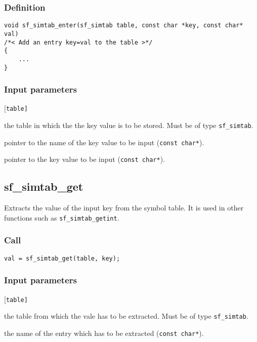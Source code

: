 \subsubsection*{Definition}
\begin{verbatim}
void sf_simtab_enter(sf_simtab table, const char *key, const char* val)
/*< Add an entry key=val to the table >*/
{
    ...
}
\end{verbatim}

\subsubsection*{Input parameters}
\begin{desclist}{\tt }{\quad}[\tt table]
   \setlength\itemsep{0pt}
   \item[table] the table in which the the key value is to be stored. Must be of type \texttt{sf\_simtab}.
   \item[key]   pointer to the name of the key value to be input (\texttt{const char*}).
   \item[val]   pointer to the key value to be input (\texttt{const char*}).
\end{desclist}




\subsection{{sf\_simtab\_get}}\label{sec:sf_simtab_get}
Extracts the value of the input key from the symbol table. It is used in other functions such as \texttt{sf\_simtab\_getint}.

\subsubsection*{Call}
\begin{verbatim}val = sf_simtab_get(table, key); \end{verbatim}

\subsubsection*{Input parameters}
\begin{desclist}{\tt }{\quad}[\tt table]
   \setlength\itemsep{0pt}
   \item[table] the table from which the vale has to be extracted. Must be of type \texttt{sf\_simtab}.
   \item[key]   the name of the entry which has to be extracted (\texttt{const char*}).
\end{desclist}

